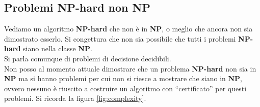 														\subsection{Problemi NP-hard non NP}
														Vediamo un algoritmo \textbf{NP-hard} che non è in \textbf{NP}, o meglio che
														ancora non sia dimostrato esserlo.
														Si congettura che non sia possibile che tutti i problemi \textbf{NP-hard} siano
														nella classe \textbf{NP}.\\ 
														Si parla comunque di problemi di decisione decidibili.\\
														Non posso al momento attuale dimostrare che un problema \textbf{NP-hard} non sia
														in \textbf{NP} ma si hanno problemi per cui non si riesce a mostrare che siano
														in \textbf{NP}, ovvero nessuno è riuscito a costruire un algoritmo con
														``certificato'' per questi problemi. Si ricorda la figura
														\ref{fig:complexity}.
